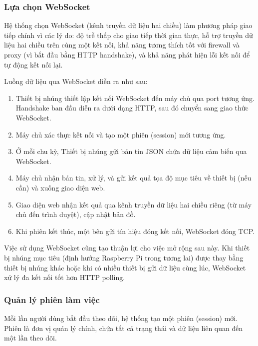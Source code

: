 \subsubsection{Lựa chọn WebSocket}

\hspace{0.5cm} Hệ thống chọn WebSocket (kênh truyền dữ liệu hai chiều) làm phương pháp giao tiếp chính vì các lý do: độ trễ thấp cho giao tiếp thời gian thực, hỗ trợ truyền dữ liệu hai chiều trên cùng một kết nối, khả năng tương thích tốt với firewall và proxy (vì bắt đầu bằng HTTP handshake), và khả năng phát hiện lỗi kết nối để tự động kết nối lại.

Luồng dữ liệu qua WebSocket diễn ra như sau:

\begin{enumerate}
    \item Thiết bị nhúng thiết lập kết nối WebSocket đến máy chủ qua port tương ứng. Handshake ban đầu diễn ra dưới dạng HTTP, sau đó chuyển sang giao thức WebSocket.
    \item Máy chủ xác thực kết nối và tạo một phiên (session) mới tương ứng.
    \item Ở mỗi chu kỳ, Thiết bị nhúng gửi bản tin JSON chứa dữ liệu cảm biến qua WebSocket.
    \item Máy chủ nhận bản tin, xử lý, và gửi kết quả tọa độ mục tiêu về thiết bị (nếu cần) và xuống giao diện web.
    \item Giao diện web nhận kết quả qua kênh truyền dữ liệu hai chiều riêng (từ máy chủ đến trình duyệt), cập nhật bản đồ.
    \item Khi phiên kết thúc, một bên gửi tín hiệu đóng kết nối, WebSocket đóng TCP.
\end{enumerate}

Việc sử dụng WebSocket cũng tạo thuận lợi cho việc mở rộng sau này. Khi thiết bị nhúng mục tiêu (định hướng Raspberry Pi trong tương lai) được thay bằng thiết bị nhúng khác hoặc khi có nhiều thiết bị gửi dữ liệu cùng lúc, WebSocket xử lý đa kết nối tốt hơn HTTP polling.

\subsubsection{Quản lý phiên làm việc}

\hspace{0.5cm} Mỗi lần người dùng bắt đầu theo dõi, hệ thống tạo một phiên (session) mới. Phiên là đơn vị quản lý chính, chứa tất cả trạng thái và dữ liệu liên quan đến một lần theo dõi.

